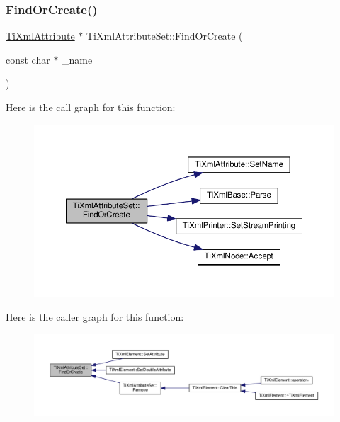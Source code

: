 \subsubsection{\texorpdfstring{Find\+Or\+Create()}{FindOrCreate()}}
{\footnotesize\ttfamily \hyperlink{class_ti_xml_attribute}{Ti\+Xml\+Attribute} $\ast$ Ti\+Xml\+Attribute\+Set\+::\+Find\+Or\+Create (\begin{DoxyParamCaption}\item[{const char $\ast$}]{\+\_\+name }\end{DoxyParamCaption})}

Here is the call graph for this function\+:\nopagebreak
\begin{figure}[H]
\begin{center}
\leavevmode
\includegraphics[width=350pt]{class_ti_xml_attribute_set_a5e28f5d32f048fba85d04dc317495bdc_cgraph}
\end{center}
\end{figure}
Here is the caller graph for this function\+:\nopagebreak
\begin{figure}[H]
\begin{center}
\leavevmode
\includegraphics[width=350pt]{class_ti_xml_attribute_set_a5e28f5d32f048fba85d04dc317495bdc_icgraph}
\end{center}
\end{figure}
\mbox{\label{class_ti_xml_attribute_set_a85dfd2b5bae45c94334dced146f5c11a}} 

